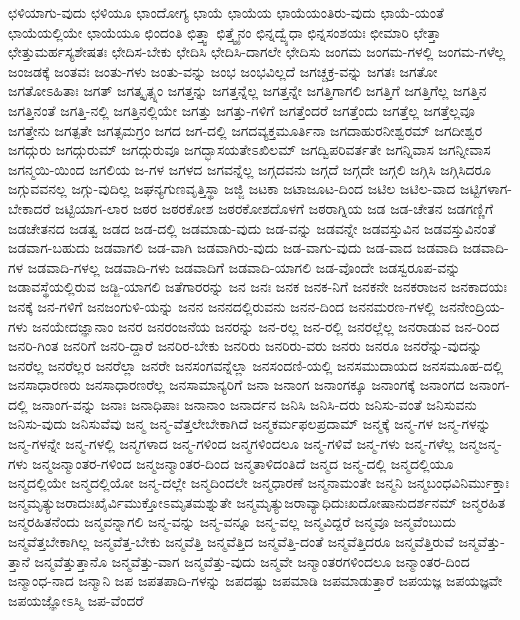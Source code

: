 {ಛಳಿಯಾಗು-ವುದು
ಛಳಿಯೂ
ಛಾಂದೋಗ್ಯ
ಛಾಯೆ
ಛಾಯೆಯ
ಛಾಯೆಯಂತಿರು-ವುದು
ಛಾಯೆ-ಯಂತೆ
ಛಾಯೆಯಲ್ಲಿಯೇ
ಛಾಯೆಯೂ
ಛಿಂದಂತಿ
ಛಿತ್ತ್ವಾ
ಛಿತ್ತ್ವೈನಂ
ಛಿನ್ನದ್ವ್ಯೆಧಾ
ಛಿನ್ನಸಂಶಯಃ
ಛೀಮಾರಿ
ಛೇತ್ತಾ
ಛೇತ್ತುಮರ್ಹಸ್ಯಶೇಷತಃ
ಛೇದಿಸ-ಬೇಕು
ಛೇದಿಸಿ
ಛೇದಿಸಿ-ದಾಗಲೇ
ಛೇದಿಸು
ಜಂಗಮ
ಜಂಗಮ-ಗಳಲ್ಲಿ
ಜಂಗಮ-ಗಳೆಲ್ಲ
ಜಂಜಡಕ್ಕೆ
ಜಂತವಃ
ಜಂತು-ಗಳು
ಜಂತು-ವನ್ನು
ಜಂಭ
ಜಂಭವಿಲ್ಲದೆ
ಜಗಚ್ಚಕ್ರ-ವನ್ನು
ಜಗತಃ
ಜಗತೋ
ಜಗತೋಽಹಿತಾಃ
ಜಗತ್
ಜಗತ್ಕೃತ್ಸ್ನಂ
ಜಗತ್ತನ್ನು
ಜಗತ್ತನ್ನೆಲ್ಲ
ಜಗತ್ತನ್ನೇ
ಜಗತ್ತಿಗಾಗಲಿ
ಜಗತ್ತಿಗೆ
ಜಗತ್ತಿಗೆಲ್ಲ
ಜಗತ್ತಿನ
ಜಗತ್ತಿನಂತೆ
ಜಗತ್ತಿ-ನಲ್ಲಿ
ಜಗತ್ತಿನಲ್ಲಿಯೇ
ಜಗತ್ತು
ಜಗತ್ತು-ಗಳಿಗೆ
ಜಗತ್ತೆಂದರೆ
ಜಗತ್ತೆಂದು
ಜಗತ್ತೆಲ್ಲ
ಜಗತ್ತೆಲ್ಲವೂ
ಜಗತ್ತೇನು
ಜಗತ್ಪತೇ
ಜಗತ್ಸಮಗ್ರಂ
ಜಗದ
ಜಗ-ದಲ್ಲಿ
ಜಗದವ್ಯಕ್ತಮೂರ್ತಿನಾ
ಜಗದಾಹುರನೀಶ್ವರಮ್
ಜಗದೀಶ್ವರ
ಜಗದ್ಗುರು
ಜಗದ್ಗುರುಮ್
ಜಗದ್ಗುರುವೂ
ಜಗದ್ಭಾಸಯತೇಽಖಿಲಮ್
ಜಗದ್ವಿಪರಿವರ್ತತೇ
ಜಗನ್ನಿವಾಸ
ಜಗನ್ನೀವಾಸ
ಜಗನ್ಮಯಿ-ಯಿಂದ
ಜಗಲಿಯ
ಜ-ಗಳ
ಜಗಳದ
ಜಗವನ್ನೆಲ್ಲ
ಜಗ್ಗದವನು
ಜಗ್ಗದೆ
ಜಗ್ಗದೇ
ಜಗ್ಗಲಿ
ಜಗ್ಗಿಸಿ
ಜಗ್ಗಿಸಿದರೂ
ಜಗ್ಗುವವನಲ್ಲ
ಜಗ್ಗು-ವುದಿಲ್ಲ
ಜಘನ್ಯಗುಣವೃತ್ತಿಸ್ಥಾ
ಜಜ್ಜಿ
ಜಟಕಾ
ಜಟಾಜೂಟ-ದಿಂದ
ಜಟಿಲ
ಜಟಿಲ-ವಾದ
ಜಟ್ಟಿಗಳಾಗ-ಬೇಕಾದರೆ
ಜಟ್ಟಿಯಾಗ-ಲಾರ
ಜಠರ
ಜಠರಕೋಶ
ಜಠರಕೋಶದೊಳಗೆ
ಜಠರಾಗ್ನಿಯ
ಜಡ
ಜಡ-ಚೇತನ
ಜಡಗಣ್ಣಿಗೆ
ಜಡಚೇತನದ
ಜಡತ್ವ
ಜಡದ
ಜಡ-ದಲ್ಲಿ
ಜಡಮಾಡು-ವುದು
ಜಡ-ವನ್ನು
ಜಡವನ್ನೇ
ಜಡವಸ್ತುವಿನ
ಜಡವಸ್ತುವಿನಂತೆ
ಜಡವಾಗ-ಬಹುದು
ಜಡವಾಗಲಿ
ಜಡ-ವಾಗಿ
ಜಡವಾಗಿರು-ವುದು
ಜಡ-ವಾಗು-ವುದು
ಜಡ-ವಾದ
ಜಡವಾದಿ
ಜಡವಾದಿ-ಗಳ
ಜಡವಾದಿ-ಗಳಲ್ಲ
ಜಡವಾದಿ-ಗಳು
ಜಡವಾದಿಗೆ
ಜಡವಾದಿ-ಯಾಗಲಿ
ಜಡ-ವೊಂದೇ
ಜಡಸ್ವರೂಪ-ವನ್ನು
ಜಡಾವಸ್ಥೆಯಲ್ಲಿರುವ
ಜಡ್ಜಿ-ಯಾಗಲಿ
ಜತೆಗಾರರನ್ನು
ಜನ
ಜನಃ
ಜನಕ
ಜನಕ-ನಿಗೆ
ಜನಕನೇ
ಜನಕರಾಜನ
ಜನಕಾದಯಃ
ಜನಕ್ಕೆ
ಜನ-ಗಳಿಗೆ
ಜನಜಂಗುಳಿ-ಯನ್ನು
ಜನನ
ಜನನದಲ್ಲಿರುವನು
ಜನನ-ದಿಂದ
ಜನನಮರಣ-ಗಳಲ್ಲಿ
ಜನನೇಂದ್ರಿಯ-ಗಳು
ಜನಯೇದಜ್ಞಾನಾಂ
ಜನರ
ಜನರಂಜನೆಯ
ಜನರನ್ನು
ಜನ-ರಲ್ಲ
ಜನ-ರಲ್ಲಿ
ಜನರಲ್ಲೆಲ್ಲ
ಜನರಾಡುವ
ಜನ-ರಿಂದ
ಜನರಿ-ಗಿಂತ
ಜನರಿಗೆ
ಜನರಿ-ದ್ದಾರೆ
ಜನರಿರ-ಬೇಕು
ಜನರಿರು
ಜನರಿರು-ವರು
ಜನರು
ಜನರೂ
ಜನರೆನ್ನು-ವುದನ್ನು
ಜನರೆಲ್ಲ
ಜನರೆಲ್ಲರ
ಜನರೆಲ್ಲಾ
ಜನರೇ
ಜನಸಂಗವನ್ನೆಲ್ಲಾ
ಜನಸಂದಣಿ-ಯಲ್ಲಿ
ಜನಸಮುದಾಯದ
ಜನಸಮೂಹ-ದಲ್ಲಿ
ಜನಸಾಧಾರಣರು
ಜನಸಾಧಾರಣರೆಲ್ಲ
ಜನಸಾಮಾನ್ಯರಿಗೆ
ಜನಾ
ಜನಾಂಗ
ಜನಾಂಗಕ್ಕೂ
ಜನಾಂಗಕ್ಕೆ
ಜನಾಂಗದ
ಜನಾಂಗ-ದಲ್ಲಿ
ಜನಾಂಗ-ವನ್ನು
ಜನಾಃ
ಜನಾಧಿಪಾಃ
ಜನಾನಾಂ
ಜನಾರ್ದನ
ಜನಿಸಿ
ಜನಿಸಿ-ದರು
ಜನಿಸು-ವಂತೆ
ಜನಿಸುವನು
ಜನಿಸು-ವುದು
ಜನಿಸುವೆವು
ಜನ್ಮ
ಜನ್ಮ-ವೆತ್ತಲೇಬೇಕಾಗಿದೆ
ಜನ್ಮಕರ್ಮಫಲಪ್ರದಾಮ್
ಜನ್ಮಕ್ಕೆ
ಜನ್ಮ-ಗಳ
ಜನ್ಮ-ಗಳನ್ನು
ಜನ್ಮ-ಗಳನ್ನೇ
ಜನ್ಮ-ಗಳಲ್ಲಿ
ಜನ್ಮಗಳಾದ
ಜನ್ಮ-ಗಳಿಂದ
ಜನ್ಮಗಳಿಂದಲೂ
ಜನ್ಮ-ಗಳಿವೆ
ಜನ್ಮ-ಗಳು
ಜನ್ಮ-ಗಳೆಲ್ಲ
ಜನ್ಮಜನ್ಮ-ಗಳು
ಜನ್ಮಜನ್ಮಾಂತರ-ಗಳಿಂದ
ಜನ್ಮಜನ್ಮಾಂತರ-ದಿಂದ
ಜನ್ಮತಾಳಿದಂತಿದೆ
ಜನ್ಮದ
ಜನ್ಮ-ದಲ್ಲಿ
ಜನ್ಮದಲ್ಲಿಯೂ
ಜನ್ಮದಲ್ಲಿಯೇ
ಜನ್ಮದಲ್ಲಿಯೋ
ಜನ್ಮ-ದಲ್ಲೇ
ಜನ್ಮದಿಂದಲೇ
ಜನ್ಮಧಾರಣೆ
ಜನ್ಮನಾಮಂತೇ
ಜನ್ಮನಿ
ಜನ್ಮಬಂಧವಿನಿರ್ಮುಕ್ತಾಃ
ಜನ್ಮಮೃತ್ಯುಜರಾದುಃಖೈರ್ವಿಮುಕ್ತೋಽಮೃತಮಶ್ನುತೇ
ಜನ್ಮಮೃತ್ಯುಜರಾವ್ಯಾಧಿದುಃಖದೋಷಾನುದರ್ಶನಮ್
ಜನ್ಮರಹಿತ
ಜನ್ಮರಹಿತನೆಂದು
ಜನ್ಮವನ್ನಾಗಲಿ
ಜನ್ಮ-ವನ್ನು
ಜನ್ಮ-ವನ್ನೂ
ಜನ್ಮ-ವಲ್ಲ
ಜನ್ಮವಿದ್ದರೆ
ಜನ್ಮವೂ
ಜನ್ಮವೆಂಬುದು
ಜನ್ಮವೆತ್ತಬೇಕಾಗಿಲ್ಲ
ಜನ್ಮವೆತ್ತ-ಬೇಕು
ಜನ್ಮವೆತ್ತಿ
ಜನ್ಮವೆತ್ತಿದ
ಜನ್ಮವೆತ್ತಿ-ದಂತೆ
ಜನ್ಮವೆತ್ತಿದರೂ
ಜನ್ಮವೆತ್ತಿರುವೆ
ಜನ್ಮವೆತ್ತು-ತ್ತಾನೆ
ಜನ್ಮವೆತ್ತುತ್ತಾನೊ
ಜನ್ಮವೆತ್ತು-ವಾಗ
ಜನ್ಮವೆತ್ತು-ವುದು
ಜನ್ಮವೇ
ಜನ್ಮಾಂತರಗಳಿಂದಲೂ
ಜನ್ಮಾಂತರ-ದಿಂದ
ಜನ್ಮಾಂಧ-ನಾದ
ಜನ್ಮಾನಿ
ಜಪ
ಜಪತಪಾದಿ-ಗಳನ್ನು
ಜಪದಷ್ಟು
ಜಪಮಾಡಿ
ಜಪಮಾಡುತ್ತಾರೆ
ಜಪಯಜ್ಞ
ಜಪಯಜ್ಞವೇ
ಜಪಯಜ್ಞೋಽಸ್ಮಿ
ಜಪ-ವೆಂದರೆ
}
